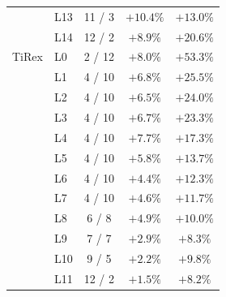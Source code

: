 \documentclass{article} %
\begin{document}
\begin{table}[p]
\begin{tabular}{@{}llccc@{}}
 & L13 & 11 / 3 & $+10.4\%$ & $+13.0\%$ \\
 & L14 & 12 / 2 & $+8.9\%$ & $+20.6\%$ \\
\midrule
TiRex & L0 & 2 / 12 & $+8.0\%$ & $+53.3\%$ \\
 & L1 & 4 / 10 & $+6.8\%$ & $+25.5\%$ \\
 & L2 & 4 / 10 & $+6.5\%$ & $+24.0\%$ \\
 & L3 & 4 / 10 & $+6.7\%$ & $+23.3\%$ \\
 & L4 & 4 / 10 & $+7.7\%$ & $+17.3\%$ \\
 & L5 & 4 / 10 & $+5.8\%$ & $+13.7\%$ \\
 & L6 & 4 / 10 & $+4.4\%$ & $+12.3\%$ \\
 & L7 & 4 / 10 & $+4.6\%$ & $+11.7\%$ \\
 & L8 & 6 / 8 & $+4.9\%$ & $+10.0\%$ \\
 & L9 & 7 / 7 & $+2.9\%$ & $+8.3\%$ \\
 & L10 & 9 / 5 & $+2.2\%$ & $+9.8\%$ \\
 & L11 & 12 / 2 & $+1.5\%$ & $+8.2\%$ \\
\bottomrule
\end{tabular}
\end{table}

\clearpage









\end{document}
